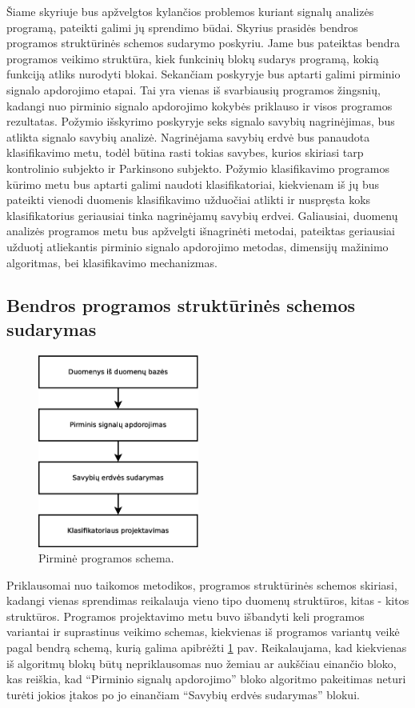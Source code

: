 \documentclass[]{vgtuef}
\begin{document}
Šiame skyriuje bus apžvelgtos kylančios problemos kuriant signalų analizės programą, pateikti galimi jų sprendimo būdai. Skyrius prasidės bendros programos struktūrinės schemos sudarymo poskyriu. Jame bus pateiktas bendra programos veikimo struktūra, kiek funkcinių blokų sudarys programą, kokią funkciją atliks nurodyti blokai. Sekančiam poskyryje bus aptarti galimi pirminio signalo apdorojimo etapai. Tai yra vienas iš svarbiausių programos žingsnių, kadangi nuo pirminio signalo apdorojimo kokybės priklauso ir visos programos rezultatas. Požymio išskyrimo poskyryje seks signalo savybių nagrinėjimas, bus atlikta signalo savybių analizė. Nagrinėjama savybių erdvė bus panaudota klasifikavimo metu, todėl būtina rasti tokias savybes, kurios skiriasi tarp kontrolinio subjekto ir Parkinsono subjekto. Požymio klasifikavimo programos kūrimo metu bus aptarti galimi naudoti klasifikatoriai, kiekvienam iš jų bus pateikti vienodi duomenis klasifikavimo užduočiai atlikti ir nuspręsta koks klasifikatorius geriausiai tinka nagrinėjamų savybių erdvei. Galiausiai, duomenų analizės programos metu bus apžvelgti išnagrinėti metodai, pateiktas geriausiai užduotį atliekantis pirminio signalo apdorojimo metodas, dimensijų mažinimo algoritmas, bei klasifikavimo mechanizmas.

\subsection{Bendros programos struktūrinės schemos sudarymas}

\begin{figure}[!b]
  \centering
  \includegraphics[width=200px]{figures/pirmine_schema.eps}
  \caption{Pirminė programos schema.}
  \label{fig:pirmine_programos_schema}
\end{figure}

Priklausomai nuo taikomos metodikos, programos struktūrinės schemos skiriasi, kadangi vienas sprendimas reikalauja vieno tipo duomenų struktūros, kitas - kitos struktūros. Programos projektavimo metu buvo išbandyti keli programos variantai ir suprastinus veikimo schemas, kiekvienas iš programos variantų veikė pagal bendrą schemą, kurią galima apibrėžti \ref{fig:pirmine_programos_schema} pav. Reikalaujama, kad kiekvienas iš algoritmų blokų būtų nepriklausomas nuo žemiau ar aukščiau einančio bloko, kas reiškia, kad ``Pirminio signalų apdorojimo'' bloko algoritmo pakeitimas neturi turėti jokios įtakos po jo einančiam ``Savybių erdvės sudarymas'' blokui. 
\end{document}
